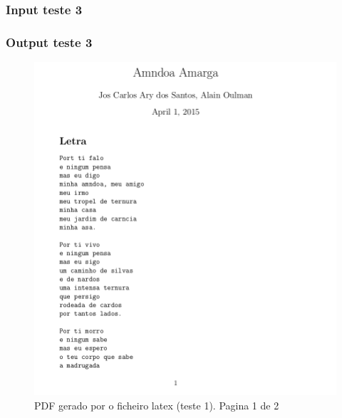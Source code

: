 \subsubsection{Input teste 3}
\label{seq:anex-music-test-in03}


\subsubsection{Output teste 3}
\label{seq:anex-music-test-out03}


\begin{figure}
\centering
\includegraphics[width=15cm]{anexos/2-5-a-img1.png}
\caption{PDF gerado por o ficheiro latex (teste 1). Pagina 1 de 2}
\end{figure}


